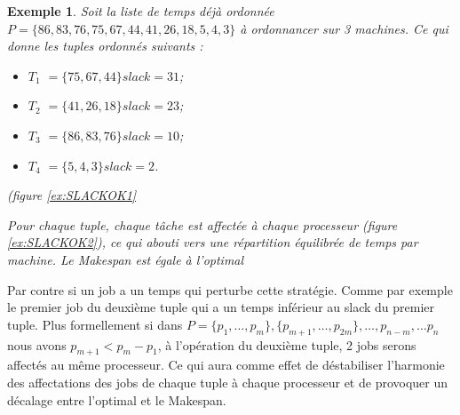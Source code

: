 \documentclass[a4paper,12pt]{report}
\theoremstyle{plain}				%
\newtheorem{example}{Exemple}
\theoremstyle{definition}				%
\begin{document}
\begin{example}
Soit la liste de temps déjà ordonnée $P = \{86, 83, 76, 75, 67, 44, 41, 26, 18, 5, 4, 3\}$ à ordonnancer sur 3 machines. Ce qui donne les tuples ordonnés suivants :
\begin{itemize}
	\item $T_1$ $=\{75, 67, 44\} slack = 31$; 
	\item $T_2$ $=\{41, 26, 18\} slack = 23$; 
	\item $T_3$ $=\{86, 83, 76\} slack = 10$;
	\item $T_4$ $=\{5, 4, 3\} slack = 2$.
\end{itemize}
(figure \ref{ex:SLACKOK1}

Pour chaque tuple, chaque tâche est affectée à chaque processeur (figure \ref{ex:SLACKOK2}), ce qui abouti vers une répartition équilibrée de temps par machine. Le Makespan est égale à l'optimal

\end{example}

Par contre si un job a un temps qui perturbe cette stratégie. Comme par exemple le premier job du deuxième tuple qui a un temps inférieur au slack du premier tuple. 
Plus formellement si dans 
$P = \{p_1, \ldots, p_m\}, \{p_{m+1}, \ldots, p_{2m}\}, \ldots, {p_{n-m}, \ldots p_n}$ 
nous avons $p_{m+1} < p_m - p_1$, à l’opération du deuxième tuple, 2 jobs serons affectés au même processeur. Ce qui aura comme effet de déstabiliser l'harmonie des affectations des jobs de chaque tuple à chaque processeur et de provoquer un décalage entre l'optimal et le Makespan.

 
\end{document}
